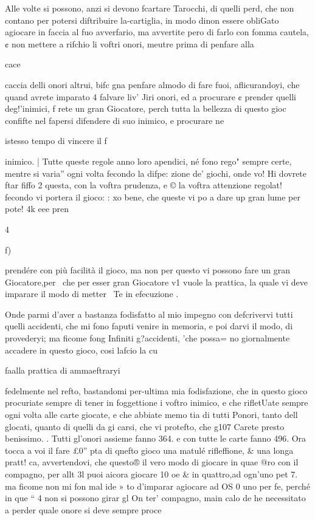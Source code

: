 \documentclass[12pt,a6paper]{article}
\begin{document}
Alle volte si possono, anzi si
devono fcartare Tarocchi, di
quelli perd, che non contano
per potersi diftribuire la-cartiglia, in modo dinon essere obliGato agiocare in faccia al fuo
avverfario, ma avvertite pero di
farlo con fomma cautela, ¢ non
mettere a rifchio li voftri onori,
meutre prima di penfare alla

cace
 

 

 

 

 

 

 

 

caccia delli onori altrui, bifc
gna penfare almodo di fare
fuoi, aflicurandoyi, che quand
avrete imparato 4 falvare liv’
Jiri onori, ed a procurare ¢
prender quelli deg!’inimici, f
rete un gran Giocatore, perch
tutta la bellezza di questo gioc
confifte nel fapersi difendere di
suo inimico, e procurare ne

istesso tempo di vincere il f

inimico. |
Tutte queste regole anno
loro apendici, né fono rego"
sempre certe, mentre si varia”
ogni volta fecondo la difpe:
zione de’ giochi, onde vo! Hi
dovrete ftar fiffo 2 questa,
con la voftra prudenza, e ©
la voftra attenzione regolat!
fecondo vi portera il gioco: :
xo bene, che queste vi po a
dare up gran lume per pote! 4k
eee pren

4
 

 

f)

prendére con più facilità il gioco,
ma non per questo vi possono fare un gran Giocatore,per~
che per esser gran Giocatore v1
vuole la prattica, la quale vi deve imparare il modo di metter~
Te in efecuzione .

Onde parmi d’aver a bastanza
fodisfatto al mio impegno con
defcrivervi tutti quelli accidenti, che mi fono faputi venire in
memoria, e poi darvi il modo,
di provederyi; ma ficome fong
Infiniti g?accidenti, 'che possa=
no giornalmente accadere in
questo gioco, cosi lafcio la cu

faalla prattica di ammaeftraryi

fedelmente nel refto, bastandomi per-ultima mia fodisfazione,
che in questo gioco procuriate
sempre di tener in foggettione
i voftro inimico, e che rifletUate
sempre ogni volta alle carte
giocate, e che abbiate memo
tia di tutti Ponori, tanto dell
glocati, quanto di quelli da gi
carsi, che vi protefto, che g107
Carete presto benissimo. .
Tutti gl'onori assieme fanno
364. e con tutte le carte fanno
496. Ora tocca a voi il fare £0”
pta di qnefto gioco una matulé
rifleffione, & una longa pratt!
ca, avvertendovi, che questo®
il vero modo di giocare in quae
@ro con il compagno, per allt
3l puoi aicora giocare 10 oe
& in quattro,ad ogn’uno pet 7.
ma ficome non mi fon mal ide »
to d’imparar agiocare ad OS 0
uno per fe, perché in que “ 4
non si possono girar gl On ter’
compagno, main calo de he
necessitato a perder quale
onore si deve sempre proce
\end{document}
